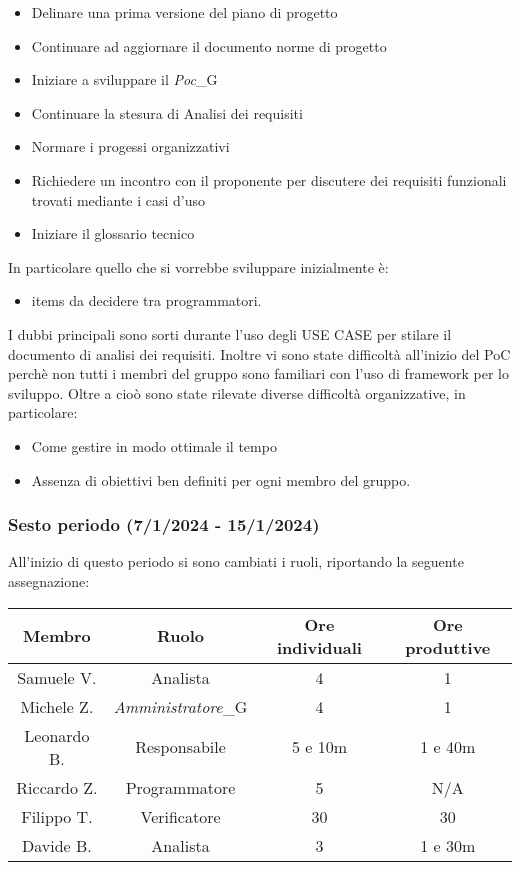 \begin{itemize}
    \item Delinare una prima versione del piano di progetto
    \item Continuare ad aggiornare il documento norme di progetto
    \item Iniziare a sviluppare il \textit{Poc}_G 
    \item Continuare la stesura di Analisi dei requisiti
    \item Normare i progessi organizzativi
    \item Richiedere un incontro con il proponente per discutere dei requisiti funzionali trovati mediante i casi d'uso
    \item Iniziare il glossario tecnico
\end{itemize}

In particolare quello che si vorrebbe sviluppare inizialmente è: 
\begin{itemize}
    \item items da decidere tra programmatori.
\end{itemize}


I dubbi principali sono sorti durante l'uso degli USE CASE per stilare il documento di analisi dei requisiti. Inoltre vi sono state difficoltà all'inizio del PoC perchè non tutti i membri del gruppo sono familiari con l'uso di framework per lo sviluppo.
Oltre a cioò sono state rilevate diverse difficoltà organizzative, in particolare:
\begin{itemize}
    \item Come gestire in modo ottimale il tempo
    \item Assenza di obiettivi ben definiti per ogni membro del gruppo.
\end{itemize}

\subsubsection{Sesto periodo (7/1/2024 - 15/1/2024)}
All'inizio di questo periodo si sono cambiati i ruoli, riportando la seguente assegnazione:

\vspace{10 mm}
\begin{tabular}{|c|c|c|c|}
\hline
\textbf{Membro} & \textbf{Ruolo} & \textbf{Ore individuali} & \textbf{Ore produttive} \\
\hline
Samuele V. & Analista & 4 & 1 \\
\hline
Michele Z. & \textit{Amministratore}_G & 4 & 1 \\
\hline
Leonardo B. & Responsabile & 5 e 10m & 1 e 40m \\
\hline
Riccardo Z. & Programmatore & 5 & N/A \\
\hline
Filippo T. & Verificatore & 30 & 30 \\
\hline
Davide B. & Analista & 3 & 1 e 30m \\
\hline
\end{tabular}
\vspace{10 mm}

